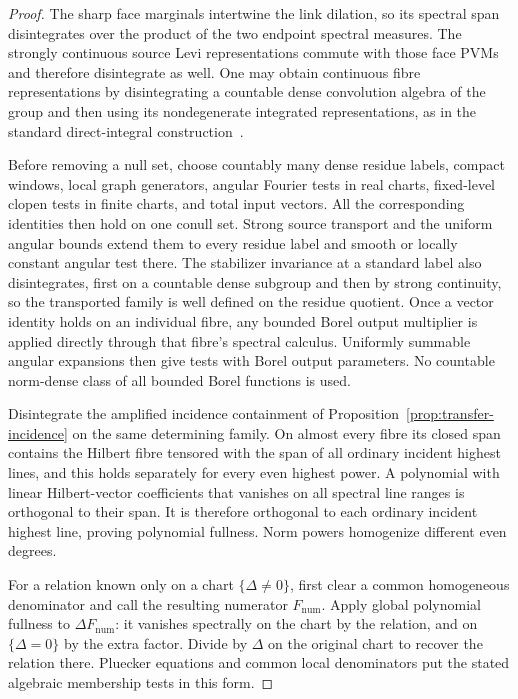 \begin{proof}
The sharp face marginals intertwine the link dilation, so its spectral
span disintegrates over the product of the two endpoint spectral
measures. The strongly continuous source Levi representations commute
with those face PVMs and therefore disintegrate as well. One may obtain
continuous fibre representations by disintegrating a countable dense
convolution algebra of the group and then using its nondegenerate
integrated representations, as in the standard direct-integral
construction~\cite[Theorem~1.G.6]{BekkaHarpe2019}.

Before removing a null set, choose countably many dense residue
labels, compact windows, local graph generators, angular Fourier
tests in real charts, fixed-level clopen tests in finite charts, and
total input vectors. All the corresponding identities then hold on
one conull set. Strong source transport and the uniform angular
bounds extend them to every residue label and smooth or locally
constant angular test there. The stabilizer invariance at a standard
label also disintegrates, first on a countable dense subgroup and
then by strong continuity, so the transported family is well defined
on the residue quotient. Once a vector identity holds on an individual
fibre, any bounded Borel output multiplier is applied directly through
that fibre's spectral calculus. Uniformly summable angular expansions
then give tests with Borel output parameters. No countable norm-dense
class of all bounded Borel functions is used.

Disintegrate the amplified incidence containment of
Proposition~\ref{prop:transfer-incidence} on the same determining
family. On almost every fibre its closed span contains the Hilbert
fibre tensored with the span of all ordinary incident highest lines,
and this holds separately for every even highest power. A polynomial
with linear Hilbert-vector coefficients that vanishes on all spectral
line ranges is orthogonal to their span. It is therefore orthogonal
to each ordinary incident highest line, proving polynomial fullness.
Norm powers homogenize different even degrees.

For a relation known only on a chart $\{\Delta\ne0\}$, first clear a
common homogeneous denominator and call the resulting numerator
$F_{\mathrm{num}}$. Apply global polynomial fullness to
$\Delta F_{\mathrm{num}}$: it vanishes spectrally on the chart by the
relation, and on $\{\Delta=0\}$ by the extra factor. Divide by
$\Delta$ on the original chart to recover the relation there.
Pluecker equations and common local denominators put the stated
algebraic membership tests in this form.
\end{proof}
